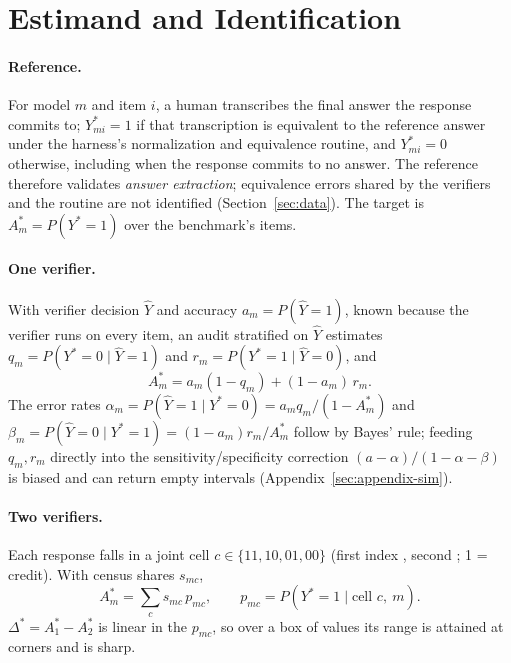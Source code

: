 \section{Estimand and Identification}
\label{sec:setup}

\paragraph{Reference.} For model $m$ and item $i$, a human transcribes the
final answer the response commits to; $Y^\ast_{mi}=1$ if that transcription
is equivalent to the reference answer under the harness's normalization and
equivalence routine, and $Y^\ast_{mi}=0$ otherwise, including when the
response commits to no answer. The reference therefore validates
\emph{answer extraction}; equivalence errors shared by the verifiers and the
routine are not identified (Section~\ref{sec:data}). The target is
$A^\ast_m=P(Y^\ast=1)$ over the benchmark's items.

\paragraph{One verifier.} With verifier decision $\hat Y$ and accuracy
$a_m=P(\hat Y=1)$, known because the verifier runs on every item, an audit
stratified on $\hat Y$ estimates $q_m=P(Y^\ast=0\mid\hat Y=1)$ and
$r_m=P(Y^\ast=1\mid\hat Y=0)$, and
\begin{equation}
  A^\ast_m = a_m(1-q_m) + (1-a_m)\,r_m .
  \label{eq:identity}
\end{equation}
The error rates $\alpha_m=P(\hat Y=1\mid Y^\ast=0)=a_mq_m/(1-A^\ast_m)$ and
$\beta_m=P(\hat Y=0\mid Y^\ast=1)=(1-a_m)r_m/A^\ast_m$ follow by Bayes' rule;
feeding $q_m,r_m$ directly into the sensitivity/specificity correction
$(a-\alpha)/(1-\alpha-\beta)$ is biased and can return empty intervals
(Appendix~\ref{sec:appendix-sim}).

\paragraph{Two verifiers.} Each response falls in a joint cell
$c\in\{11,10,01,00\}$ (first index , second
; 1 = credit). With census shares $s_{mc}$,
\begin{equation}
  A^\ast_m=\sum_c s_{mc}\,p_{mc},\qquad p_{mc}=P(Y^\ast=1\mid \text{cell } c,\ m).
  \label{eq:joint}
\end{equation}
$\Delta^\ast=A^\ast_1-A^\ast_2$ is linear in the $p_{mc}$, so over a box of
values its range is attained at corners and is sharp.

